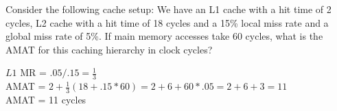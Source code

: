 \begin{blocksection}
\question
Consider the following cache setup: We have an L1 cache with a hit time of 2 cycles, L2 cache with a hit time of 18 cycles and a 15\% local miss rate and a global miss rate of 5\%. If main memory accesses take 60 cycles, what is the AMAT for this caching hierarchy in clock cycles?

\begin{solution}[0.5in]
$L1$ MR = $.05 / .15 = \frac{1}{3}$ \\
AMAT = $2 + \frac{1}{3} (18 + .15 * 60) = 2 + 6 + 60 * .05 = 2 + 6 + 3 = 11$ \\
AMAT = 11 cycles

\end{solution}
\end{blocksection}